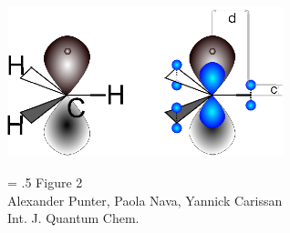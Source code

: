 \documentclass[12pt]{article}
\begin{document}
\clearpage

\begin{figure}
\begin{center}
\includegraphics[width=8cm]{scheme_complete.eps}
\end{center}
{\Large
\begin{minipage}[t]{3in}
\baselineskip = .5\baselineskip
Figure 2 \\
Alexander Punter, Paola Nava, Yannick Carissan\\
Int. J. Quantum Chem.
\end{minipage}
}
\end{figure}

\clearpage
\end{document}
